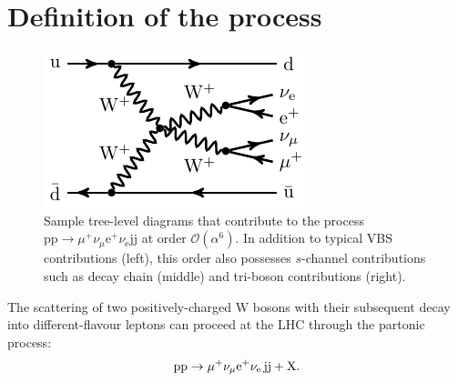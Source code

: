 \documentclass[twocolumn,epjc3]{svjour3} %
\newcommand{\Pj}{\ensuremath{\text{j}}\xspace}
\newcommand{\Pp}{\ensuremath{\text{p}}\xspace}
\newcommand{\Pe}{\ensuremath{\text{e}}\xspace}
\newcommand{\PW}{\ensuremath{\text{W}}\xspace}
\newlength{\width}
\begin{document}
\section{Definition of the process}
\label{sec:definition}
\begin{figure}[t]
\begin{center}
          \includegraphics[width=0.30\linewidth]{feynman/LO_EW_5}
\end{center}
        \caption{Sample tree-level diagrams that contribute to the process $\Pp\Pp\to\mu^+\nu_\mu\Pe^+\nu_{\Pe}\Pj\Pj$ at order $\mathcal{O}{\left(\alpha^{6}\right)}$.
        In addition to typical VBS contributions (left), this order also possesses $s$-channel contributions such as decay chain (middle) and tri-boson contributions (right).}
\label{diag:LO}
\end{figure}

The scattering of two positively-charged $\PW$ bosons with their subsequent decay into different-flavour leptons 
can proceed at the LHC through the partonic process:
%
\begin{equation}
\Pp\Pp\to\mu^+\nu_\mu{\rm e}^+\nu_{\rm e}\,\Pj\Pj+\mathrm{X}.
\end{equation}
\end{document}
